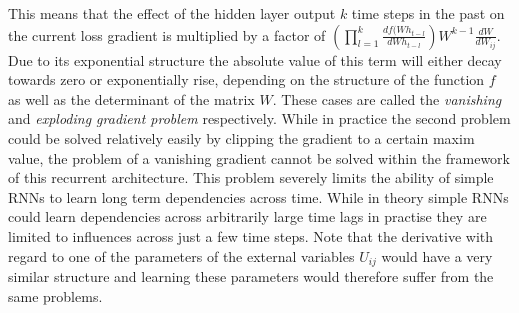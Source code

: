 This means that the effect of the hidden layer output $k$ time steps in the past on the current loss gradient is multiplied by a factor of $(\prod_{l = 1}^k \frac{df(Wh_{t-l}}{dWh_{t-l}}) W^{k-1}\frac{dW}{dW_{ij}}$. Due to its exponential structure the absolute value of this term  will either decay towards zero or exponentially rise, depending on the structure of the function $f$ as well as the determinant of the matrix $W$. These cases are called the \textit{vanishing} and \textit{exploding gradient problem} respectively. While in practice the second problem could be solved relatively easily by clipping the gradient to a certain maxim value, the problem of a vanishing gradient cannot be solved within the framework of this recurrent architecture. This problem severely limits the ability of simple RNNs to learn long term dependencies across time. While in theory simple RNNs could learn dependencies across arbitrarily large time lags in practise they are limited to influences across just a few time steps. Note that the derivative with regard to one of the parameters of the external variables $U_{ij}$ would have a very similar structure and learning these parameters would therefore suffer from the same problems.


